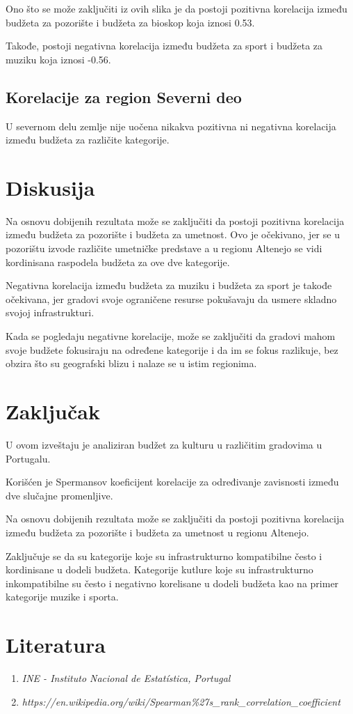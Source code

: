 \documentclass{article}
\begin{document}
Ono što se može zaključiti iz ovih slika je da postoji pozitivna korelacija između budžeta za pozorište i budžeta za bioskop koja iznosi 0.53.

Takođe, postoji negativna korelacija između budžeta za sport i budžeta za muziku koja iznosi -0.56.

\subsection{Korelacije za region Severni deo}

U severnom delu zemlje nije uočena nikakva pozitivna ni negativna korelacija između budžeta za različite kategorije.

\section{Diskusija}

Na osnovu dobijenih rezultata može se zaključiti da postoji pozitivna korelacija između budžeta za pozorište i budžeta za umetnost. Ovo je očekivano, jer se u pozorištu izvode različite umetničke predstave a u regionu Altenejo se vidi kordinisana raspodela budžeta za ove dve kategorije. 

Negativna korelacija između budžeta za muziku i budžeta za sport je takođe očekivana, jer gradovi svoje ograničene resurse pokušavaju da usmere skladno svojoj infrastrukturi. 

Kada se pogledaju negativne korelacije, može se zaključiti da gradovi mahom svoje budžete fokusiraju na određene kategorije i da im se fokus razlikuje, bez obzira što su geografski blizu i nalaze se u istim regionima. 


\section{Zaključak}

U ovom izveštaju je analiziran budžet za kulturu u različitim gradovima u Portugalu.

Korišćen je Spermansov koeficijent korelacije za određivanje zavisnosti između dve slučajne promenljive.

Na osnovu dobijenih rezultata može se zaključiti da postoji pozitivna korelacija između budžeta za pozorište i budžeta za umetnost u regionu Altenejo.

Zaključuje se da su kategorije koje su infrastrukturno kompatibilne često i kordinisane u dodeli budžeta. Kategorije kutlure koje su infrastrukturno inkompatibilne su često i negativno korelisane u dodeli budžeta kao na primer kategorije muzike i sporta.

\section{Literatura}

\begin{enumerate}
    \item \textit{INE - Instituto Nacional de Estatística, Portugal}
    \item \textit{https://en.wikipedia.org/wiki/Spearman\%27s\_rank\_correlation\_coefficient}
\end{enumerate}
\end{document}
